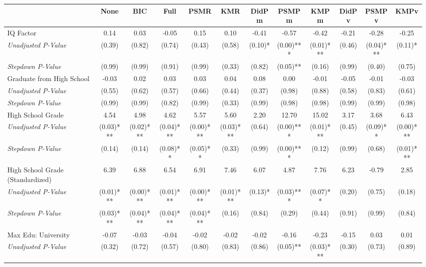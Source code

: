 \begin{tabular}{l c c c c c c c c c c c}
\toprule
 & None & BIC & Full & PSMR & KMR & DidPm & PSMPm & KMPm & DidPv & PSMPv & KMPv \\
\midrule
IQ Factor & 0.14 & 0.03 & -0.05 & 0.15 & 0.10 & -0.41 & -0.57 & -0.42 & -0.21 & -0.28 & -0.25 \\
\quad \textit{Unadjusted P-Value} & (0.39) & (0.82) & (0.74) & (0.43) & (0.58) & (0.10)* & (0.00)*** & (0.01)*** & (0.46) & (0.04)*** & (0.11)* \\
\quad \textit{Stepdown P-Value} & (0.99) & (0.99) & (0.91) & (0.99) & (0.33) & (0.82) & (0.05)** & (0.16) & (0.99) & (0.40) & (0.75) \\
Graduate from High School & -0.03 & 0.02 & 0.03 & 0.03 & 0.04 & 0.08 & 0.00 & -0.01 & -0.05 & -0.01 & -0.03 \\
\quad \textit{Unadjusted P-Value} & (0.55) & (0.62) & (0.57) & (0.66) & (0.44) & (0.37) & (0.98) & (0.88) & (0.58) & (0.83) & (0.61) \\
\quad \textit{Stepdown P-Value} & (0.99) & (0.99) & (0.82) & (0.99) & (0.33) & (0.99) & (0.98) & (0.98) & (0.99) & (0.99) & (0.98) \\
High School Grade & 4.54 & 4.98 & 4.62 & 5.57 & 5.60 & 2.20 & 12.70 & 15.02 & 3.17 & 3.68 & 6.43 \\
\quad \textit{Unadjusted P-Value} & (0.03)*** & (0.02)*** & (0.04)*** & (0.00)*** & (0.03)*** & (0.64) & (0.00)*** & (0.01)*** & (0.45) & (0.09)** & (0.00)*** \\
\quad \textit{Stepdown P-Value} & (0.14) & (0.14) & (0.08)** & (0.05)** & (0.33) & (0.99) & (0.00)*** & (0.12) & (0.99) & (0.68) & (0.01)*** \\
High School Grade (Standardized) & 6.39 & 6.88 & 6.54 & 6.91 & 7.46 & 6.07 & 4.87 & 7.76 & 6.23 & -0.79 & 2.85 \\
\quad \textit{Unadjusted P-Value} & (0.01)*** & (0.00)*** & (0.01)*** & (0.00)*** & (0.01)*** & (0.13)* & (0.03)*** & (0.07)** & (0.20) & (0.75) & (0.18) \\
\quad \textit{Stepdown P-Value} & (0.03)*** & (0.04)*** & (0.04)*** & (0.04)*** & (0.16) & (0.84) & (0.29) & (0.44) & (0.91) & (0.99) & (0.84) \\
Max Edu: University & -0.07 & -0.03 & -0.04 & -0.02 & -0.02 & -0.02 & -0.16 & -0.23 & -0.15 & 0.03 & 0.01 \\
\quad \textit{Unadjusted P-Value} & (0.32) & (0.72) & (0.57) & (0.80) & (0.83) & (0.86) & (0.05)** & (0.03)*** & (0.30) & (0.73) & (0.89) \\

\end{tabular}
